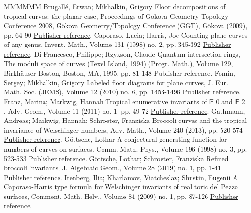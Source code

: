 \documentclass[11pt]{article}
\theoremstyle{definition}
\numberwithin{equation}{section}
\theoremstyle{plain}
\begin{document}
\begin{thebibliography}{MMMMMM}
 Brugallé, Erwan; Mikhalkin, Grigory Floor decompositions of tropical curves: the planar case, Proceedings of Gökova Geometry-Topology Conference 2008, Gökova Geometry/Topology Conference (GGT), Gökova (2009), pp. 64-90 \href{https://alco.centre-mersenne.org/articles/10.5802/alco.444/#brugalle_floor_2008}{Publisher reference}.
 Caporaso, Lucia; Harris, Joe Counting plane curves of any genus, Invent. Math., Volume 131 (1998) no. 2, pp. 345-392 \href{https://alco.centre-mersenne.org/articles/10.5802/alco.444/#caporaso_counting_1998}{Publisher reference}.
 Di Francesco, Philippe; Itzykson, Claude Quantum intersection rings, The moduli space of curves (Texel Island, 1994) (Progr. Math.), Volume 129, Birkhäuser Boston, Boston, MA, 1995, pp. 81-148 \href{https://alco.centre-mersenne.org/articles/10.5802/alco.444/#di_francesco_quantum_1995}{Publisher reference}.
 Fomin, Sergey; Mikhalkin, Grigory Labeled floor diagrams for plane curves, J. Eur. Math. Soc. (JEMS), Volume 12 (2010) no. 6, pp. 1453-1496 \href{https://alco.centre-mersenne.org/articles/10.5802/alco.444/#fomin_labeled_2010}{Publisher reference}.
 Franz, Marina; Markwig, Hannah Tropical enumerative invariants of 𝔽 0  and 𝔽 2 , Adv. Geom., Volume 11 (2011) no. 1, pp. 49-72 \href{https://alco.centre-mersenne.org/articles/10.5802/alco.444/#franz-2011-tropical}{Publisher reference}.
 Gathmann, Andreas; Markwig, Hannah; Schroeter, Franziska Broccoli curves and the tropical invariance of Welschinger numbers, Adv. Math., Volume 240 (2013), pp. 520-574 \href{https://alco.centre-mersenne.org/articles/10.5802/alco.444/#gathmann-2013-broccoli}{Publisher reference}.
 Göttsche, Lothar A conjectural generating function for numbers of curves on surfaces, Comm. Math. Phys., Volume 196 (1998) no. 3, pp. 523-533 \href{https://alco.centre-mersenne.org/articles/10.5802/alco.444/#gottsche_conjectural_1998}{Publisher reference}.
 Göttsche, Lothar; Schroeter, Franziska Refined broccoli invariants, J. Algebraic Geom., Volume 28 (2019) no. 1, pp. 1-41 \href{https://alco.centre-mersenne.org/articles/10.5802/alco.444/#gottsche_refined_2019}{Publisher reference}.
 Itenberg, Ilia; Kharlamov, Viatcheslav; Shustin, Eugenii A Caporaso-Harris type formula for Welschinger invariants of real toric del Pezzo surfaces, Comment. Math. Helv., Volume 84 (2009) no. 1, pp. 87-126 \href{https://alco.centre-mersenne.org/articles/10.5802/alco.444/#itenberg-2009-caporaso}{Publisher reference}.

\end{thebibliography}
\end{document}
